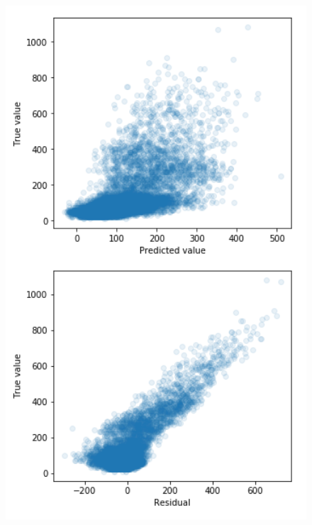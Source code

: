 \documentclass{article}
\begin{document}
\begin{figure}[H]
\centering
\begin{minipage}{0.45\textwidth}
\includegraphics[width=1\textwidth, keepaspectratio]{imgs/poly-simple.png}
\end{minipage}
%
\begin{minipage}{0.45\textwidth}

\end{minipage}
\end{figure}
\end{document}
